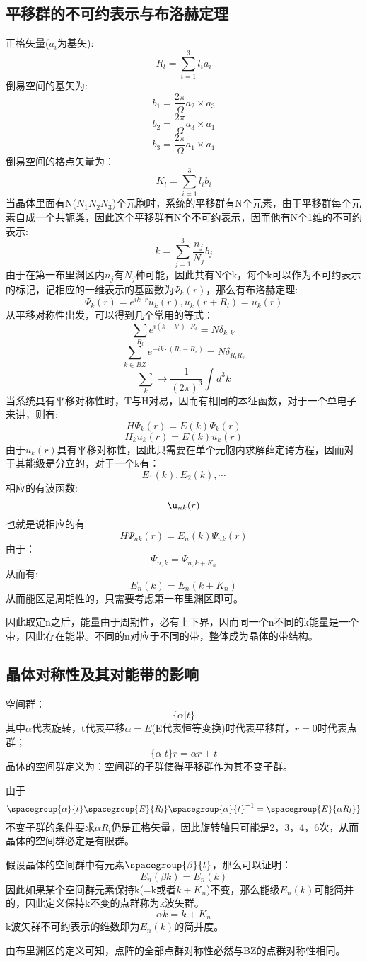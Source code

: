 \subsection{平移群的不可约表示与布洛赫定理}
正格矢量($a_i$为基矢):
\[R_l=\sum_{i=1}^3l_i a_i\]
倒易空间的基矢为:
\[b_1=\frac{2\pi}{\Omega}a_2\times a_3\]
\[b_2=\frac{2\pi}{\Omega}a_3\times a_1\]
\[b_3=\frac{2\pi}{\Omega}a_1\times a_1\]
倒易空间的格点矢量为：
\[K_l=\sum_{i=1}^3l_i b_i\]
当晶体里面有N($N_1N_2N_3$)个元胞时，系统的平移群有N个元素，由于平移群每个元素自成一个共轭类，因此这个平移群有N个不可约表示，因而他有N个1维的不可约表示:
\[k=\sum_{j=1}^3\frac{n_j}{N_j}b_j\]
由于在第一布里渊区内$n_j$有$N_j$种可能，因此共有N个k，每个k可以作为不可约表示的标记，记相应的一维表示的基函数为$\Psi_k(r)$，那么有布洛赫定理:
\[\Psi_k(r)=e^{ik\cdot r}u_k(r),u_k(r+R_l)=u_k(r)\]
从平移对称性出发，可以得到几个常用的等式：
\[\sum_{R_l}e^{i(k-k')\cdot R_l}=N\delta_{k,k'}\]
\[\sum_{k\in BZ}e^{-ik\cdot (R_l-R_s)}=N\delta_{R_l R_s}\]
\[\sum_{k}\rightarrow \frac{1}{(2\pi)^3}\int d^3k\]
当系统具有平移对称性时，T与H对易，因而有相同的本征函数，对于一个单电子来讲，则有:
\[H\Psi_k(r)=E(k)\Psi_k(r)\]
\[H_ku_k(r)=E(k)u_k(r)\]
由于$u_k(r)$具有平移对称性，因此只需要在单个元胞内求解薛定谔方程，因而对于其能级是分立的，对于一个k有：
\[E_1(k),E_2(k),\cdots\]
相应的有波函数:
\[\u_{nk}(r)\]
也就是说相应的有
\[H\Psi_{nk}(r)=E_n(k)\Psi_{nk}(r)\]
由于：
\[\Psi_{n,k}=\Psi_{n,k+K_n}\]
从而有:
\[E_{n}(k)=E_{n}(k+K_n)\]
从而能区是周期性的，只需要考虑第一布里渊区即可。\par
因此取定n之后，能量由于周期性，必有上下界，因而同一个n不同的k能量是一个带，因此存在能带。不同的n对应于不同的带，整体成为晶体的带结构。\par
\subsection{晶体对称性及其对能带的影响}
空间群：
\[\{\alpha|t\}\]
其中$\alpha$代表旋转，t代表平移$\alpha =E$(E代表恒等变换)时代表平移群，$r=0$时代表点群；
\[\{\alpha|t\}r=\alpha r+t\]
晶体的空间群定义为：空间群的子群使得平移群作为其不变子群。\par
由于
\[\spacegroup{\alpha}{t}\spacegroup{E}{R_l}\spacegroup{\alpha}{t}^{-1}=\spacegroup{E}{\alpha R_l}\}\]
不变子群的条件要求$\alpha R_l$仍是正格矢量，因此旋转轴只可能是2，3，4，6次，从而晶体的空间群必定是有限群。\par
假设晶体的空间群中有元素$\spacegroup{\beta}{t}$，那么可以证明：
\[E_n(\beta k)=E_n(k)\]
因此如果某个空间群元素保持k(=k或者$k+K_n$)不变，那么能级$E_n(k)$可能简并的，因此定义保持k不变的点群称为k波矢群。
\[\alpha k=k+K_n\]
k波矢群不可约表示的维数即为$E_n(k)$的简并度。\par
由布里渊区的定义可知，点阵的全部点群对称性必然与BZ的点群对称性相同。

